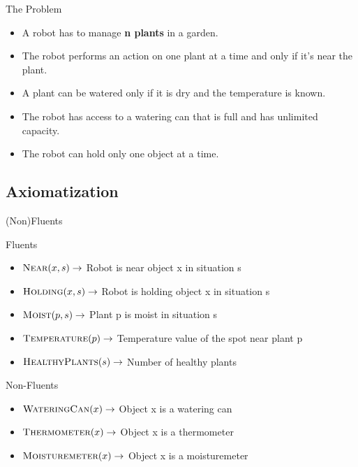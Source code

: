 
\begin{frame}{The Problem}
    \begin{itemize}
        \item A robot has to manage \textbf{n plants} in a garden.
        \item The robot performs an action on one plant at a time and only if it's near the plant.
        \item A plant can be watered only if it is dry and the temperature is known.
        \item The robot has access to a watering can that is full and has unlimited capacity.
        \item The robot can hold only one object at a time.
    \end{itemize}
\end{frame}

\subsection{Axiomatization}

\begin{frame}[fragile]{(Non)Fluents}
    \vspace*{-0.5cm}
    \begin{block}{Fluents}
        \begin{itemize}
            \item $\textsc{Near}(x,s) \rightarrow$ Robot is near object x in situation s
            \item $\textsc{Holding}(x,s) \rightarrow$ Robot is holding object x in situation s
            \item $\textsc{Moist}(p,s) \rightarrow$ Plant p is moist in situation s
            \item $\textsc{Temperature}(p) \rightarrow$ Temperature value of the spot near plant p
            \item $\textsc{HealthyPlants}(s) \rightarrow$ Number of healthy plants
        \end{itemize}
    \end{block}
    \begin{block}{Non-Fluents}
        \begin{itemize}
            \item $\textsc{WateringCan}(x) \rightarrow $ Object x is a watering can
            \item $\textsc{Thermometer}(x) \rightarrow $ Object x is a thermometer
            \item $\textsc{Moisturemeter}(x) \rightarrow $ Object x is a moisturemeter
        \end{itemize}
    \end{block}
\end{frame}

